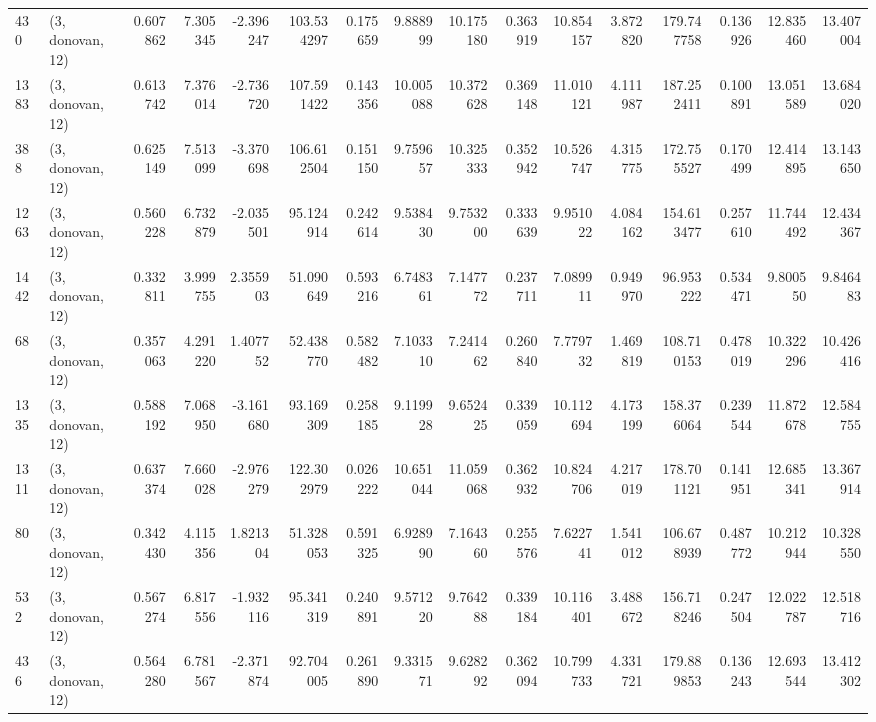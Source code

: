 \begin{tabular}{llrrrrrrrrrrrrrr}
430  &  (3, donovan, 12) &   0.607862 &   7.305345 &  -2.396247 &    103.534297 &    0.175659 &    9.888999 &   10.175180 &  0.363919 &  10.854157 &   3.872820 &   179.747758 &   0.136926 &  12.835460 &  13.407004 \\
1383 &  (3, donovan, 12) &   0.613742 &   7.376014 &  -2.736720 &    107.591422 &    0.143356 &   10.005088 &   10.372628 &  0.369148 &  11.010121 &   4.111987 &   187.252411 &   0.100891 &  13.051589 &  13.684020 \\
388  &  (3, donovan, 12) &   0.625149 &   7.513099 &  -3.370698 &    106.612504 &    0.151150 &    9.759657 &   10.325333 &  0.352942 &  10.526747 &   4.315775 &   172.755527 &   0.170499 &  12.414895 &  13.143650 \\
1263 &  (3, donovan, 12) &   0.560228 &   6.732879 &  -2.035501 &     95.124914 &    0.242614 &    9.538430 &    9.753200 &  0.333639 &   9.951022 &   4.084162 &   154.613477 &   0.257610 &  11.744492 &  12.434367 \\
1442 &  (3, donovan, 12) &   0.332811 &   3.999755 &   2.355903 &     51.090649 &    0.593216 &    6.748361 &    7.147772 &  0.237711 &   7.089911 &   0.949970 &    96.953222 &   0.534471 &   9.800550 &   9.846483 \\
68   &  (3, donovan, 12) &   0.357063 &   4.291220 &   1.407752 &     52.438770 &    0.582482 &    7.103310 &    7.241462 &  0.260840 &   7.779732 &   1.469819 &   108.710153 &   0.478019 &  10.322296 &  10.426416 \\
1335 &  (3, donovan, 12) &   0.588192 &   7.068950 &  -3.161680 &     93.169309 &    0.258185 &    9.119928 &    9.652425 &  0.339059 &  10.112694 &   4.173199 &   158.376064 &   0.239544 &  11.872678 &  12.584755 \\
1311 &  (3, donovan, 12) &   0.637374 &   7.660028 &  -2.976279 &    122.302979 &    0.026222 &   10.651044 &   11.059068 &  0.362932 &  10.824706 &   4.217019 &   178.701121 &   0.141951 &  12.685341 &  13.367914 \\
80   &  (3, donovan, 12) &   0.342430 &   4.115356 &   1.821304 &     51.328053 &    0.591325 &    6.928990 &    7.164360 &  0.255576 &   7.622741 &   1.541012 &   106.678939 &   0.487772 &  10.212944 &  10.328550 \\
532  &  (3, donovan, 12) &   0.567274 &   6.817556 &  -1.932116 &     95.341319 &    0.240891 &    9.571220 &    9.764288 &  0.339184 &  10.116401 &   3.488672 &   156.718246 &   0.247504 &  12.022787 &  12.518716 \\
436  &  (3, donovan, 12) &   0.564280 &   6.781567 &  -2.371874 &     92.704005 &    0.261890 &    9.331571 &    9.628292 &  0.362094 &  10.799733 &   4.331721 &   179.889853 &   0.136243 &  12.693544 &  13.412302 \\

\end{tabular}
